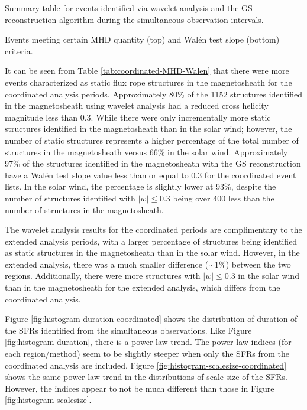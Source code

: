 \begin{table}
    \centering
    \caption{Summary table for events identified via wavelet analysis and the GS reconstruction algorithm during the simultaneous observation intervals.}
    
    \label{tab:coordinated-summary}
\end{table}

\begin{table}
    \centering
    \caption{Events meeting certain MHD quantity (top) and Wal\'en test slope (bottom) criteria.}
    
    \label{tab:coordinated-MHD-Walen}
\end{table}

It can be seen from Table \ref{tab:coordinated-MHD-Walen} that there were more events characterized as static flux rope structures in the magnetosheath for the coordinated analysis periods. Approximately 80\% of the 1152 structures identified in the magnetosheath using wavelet analysis had a reduced cross helicity magnitude less than 0.3. While there were only incrementally more static structures identified in the magnetosheath than in the solar wind; however, the number of static structures represents a higher percentage of the total number of structures in the magnetosheath versus 66\% in the solar wind. Approximately 97\% of the structures identified in the magnetosheath with the GS reconstruction have a Wal\'en test slope value less than or equal to 0.3 for the coordinated event lists. In the solar wind, the percentage is slightly lower at 93\%, despite the number of structures identified with $|w|\leq 0.3$ being over 400 less than the number of structures in the magnetosheath.

The wavelet analysis results for the coordinated periods are complimentary to the extended analysis periods, with a larger percentage of structures being identified as static structures in the magnetosheath than in the solar wind. However, in the extended analysis, there was a much smaller difference ($\sim$1\%) between the two regions. Additionally, there were more structures with $|w|\leq 0.3$ in the solar wind than in the magnetosheath for the extended analysis, which differs from the coordinated analysis. 

Figure \ref{fig:histogram-duration-coordinated} shows the distribution of duration of the SFRs identified from the simultaneous observations. Like Figure \ref{fig:histogram-duration}, there is a power law trend. The power law indices (for each region/method) seem to be slightly steeper when only the SFRs from the coordinated analysis are included. Figure \ref{fig:histogram-scalesize-coordinated} shows the same power law trend in the distributions of scale size of the SFRs. However, the indices appear to not be much different than those in Figure \ref{fig:histogram-scalesize}.

